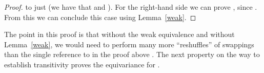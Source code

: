 \begin{isabellebody}
\begin{isamarkuptext}
\begin{proof}
  to just  (we have that  and ). 
  For the right-hand side we can prove ,
  since . From this we can conclude this 
  case using Lemma~\ref{weak}.
  \end{proof}

  \noindent
  The point in this proof is that without the weak equivalence and 
  without Lemma~\ref{weak}, we would need to perform many more 
  ``reshuffles'' of swappings than the single reference to  in the 
  proof above \cite{UrbanPittsGabbay04}.
  The next property on the way to establish transitivity  proves
  the equivariance for .

  \begin{lemma}\label{equpi}
  \end{lemma}


\end{isamarkuptext}
\end{isabellebody}
